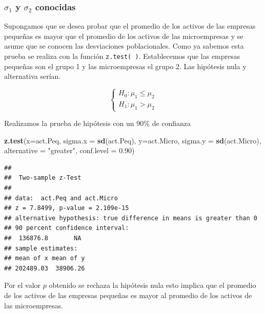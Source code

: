 \documentclass[
]{krantz}
\makeatletter
\newenvironment{Shaded}{\begin{snugshade}}{\end{snugshade}}
\newcommand{\DataTypeTok}[1]{\textcolor[rgb]{0.27,0.27,0.27}{#1}}
\newcommand{\FloatTok}[1]{\textcolor[rgb]{0.06,0.06,0.06}{#1}}
\newcommand{\KeywordTok}[1]{\textcolor[rgb]{0.27,0.27,0.27}{\textbf{#1}}}
\newcommand{\NormalTok}[1]{#1}
\newcommand{\StringTok}[1]{\textcolor[rgb]{0.5,0.5,0.5}{#1}}
\newenvironment{kframe}{%
\medskip{}
\setlength{\fboxsep}{.8em}
 \def\at@end@of@kframe{}%
 \ifinner\ifhmode%
  \def\at@end@of@kframe{\end{minipage}}%
  \begin{minipage}{\columnwidth}%
 \fi\fi%
 \def\FrameCommand##1{\hskip\@totalleftmargin \hskip-\fboxsep
 \colorbox{shadecolor}{##1}\hskip-\fboxsep
     \hskip-\linewidth \hskip-\@totalleftmargin \hskip\columnwidth}%
 \MakeFramed {\advance\hsize-\width
   \@totalleftmargin\z@ \linewidth\hsize
   \@setminipage}}%
 {\par\unskip\endMakeFramed%
 \at@end@of@kframe}
\renewenvironment{Shaded}{\begin{kframe}}{\end{kframe}}
\makeatother
\begin{document}
\hypertarget{sigma_1-y-sigma_2-conocidas-1}{%
\subsubsection{\texorpdfstring{\(\sigma_1\) y \(\sigma_2\) conocidas}{\textbackslash{}sigma\_1 y \textbackslash{}sigma\_2 conocidas}}\label{sigma_1-y-sigma_2-conocidas-1}}

Supongamos que se desea probar que el promedio de los activos de las empresas pequeñas es mayor que el promedio de los activos de las microempresas y se asume que se conocen las desviaciones poblacionales. Como ya sabemos esta prueba se realiza con la función \texttt{z.test(\ )}. Establecemos que las empresas pequeñas son el grupo 1 y las microempresas el grupo 2. Las hipótesis nula y alternativa serían.

\begin{equation} 
\begin{cases} 
H_0: \mu_1 \leq \mu_2 \\ 
H_1: \mu_1 > \mu_2
\end{cases} 
\end{equation}

Realizamos la prueba de hipótesis con un \(90\%\) de confianza

\begin{Shaded}
\begin{Highlighting}[]
\KeywordTok{z.test}\NormalTok{(}\DataTypeTok{x=}\NormalTok{act.Peq, }\DataTypeTok{sigma.x =} \KeywordTok{sd}\NormalTok{(act.Peq), }
       \DataTypeTok{y=}\NormalTok{act.Micro, }\DataTypeTok{sigma.y =} \KeywordTok{sd}\NormalTok{(act.Micro),}
       \DataTypeTok{alternative =} \StringTok{"greater"}\NormalTok{, }\DataTypeTok{conf.level =} \FloatTok{0.90}\NormalTok{)}
\end{Highlighting}
\end{Shaded}

\begin{verbatim}
## 
##  Two-sample z-Test
## 
## data:  act.Peq and act.Micro
## z = 7.8499, p-value = 2.109e-15
## alternative hypothesis: true difference in means is greater than 0
## 90 percent confidence interval:
##  136876.8       NA
## sample estimates:
## mean of x mean of y 
## 202489.03  38906.26
\end{verbatim}

Por el valor \(p\) obtenido se rechaza la hipótesis nula esto implica que el promedio de los activos de las empresas pequeñas es mayor al promedio de los activos de las microempresas.
\end{document}
